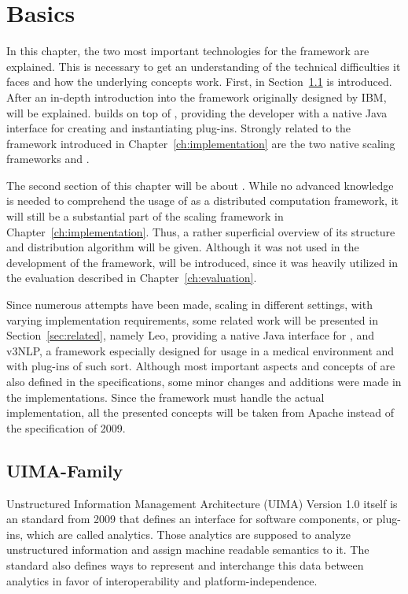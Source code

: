 
\chapter{Basics}
\label{ch:basics}
In this chapter, the two most important technologies for the framework are explained. This is necessary to get an understanding of the technical difficulties it faces and how the underlying concepts work. First, in Section~\ref{sec:uima} \uima{} is introduced. After an in-depth introduction into the framework originally designed by IBM, \uimafit{} will be explained. \uimafit{} builds on top of \uima{}, providing the developer with a native Java interface for creating and instantiating plug-ins. Strongly related to the framework introduced in Chapter~\ref{ch:implementation} are the two native scaling frameworks \uimacpe{} and \uimaas{}. 


The second section of this chapter will be about \spark{}. While no advanced knowledge is needed to comprehend the usage of \spark{} as a distributed computation framework, it will still be a substantial part of the \uima{} scaling framework in Chapter~\ref{ch:implementation}. Thus, a rather superficial overview of its structure and distribution algorithm will be given. Although it was not used in the development of the framework, \docker{} will be introduced, since it was heavily utilized in the evaluation described in Chapter~\ref{ch:evaluation}.

Since numerous attempts have been made, scaling \uima{} in different settings, with varying implementation requirements, some related work will be presented in Section~\ref{sec:related}, namely Leo, providing a native Java interface for \uimaas{}, and v3NLP, a framework especially designed for usage in a medical environment and with plug-ins of such sort. Although most important aspects and concepts of \uima{} are also defined in the specifications, some minor changes and additions were made in the implementations. Since the framework must handle the actual implementation, all the presented concepts will be taken from Apache \uima{} instead of the \uima{} specification of 2009.



\section{UIMA-Family}
\label{sec:uima}
Unstructured Information Management Architecture (UIMA) Version 1.0 itself is an \oasis{} standard from 2009 that defines an interface for software components, or plug-ins, which are called analytics. Those analytics are supposed to analyze unstructured information and assign machine readable semantics to it. The standard also defines ways to represent and interchange this data between analytics in favor of interoperability and platform-independence. 

